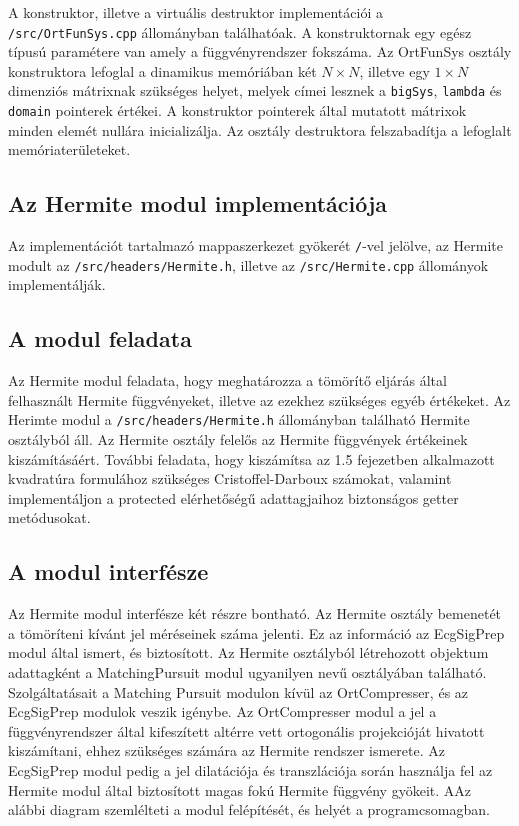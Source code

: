\documentclass[oneside,titlepage,12pt,a4paper]{report}
\begin{document}
\par A konstruktor, illetve a virtuális destruktor implementációi a \texttt{/src/OrtFunSys.cpp} állományban találhatóak. A konstruktornak egy egész típusú paramétere van amely a függvényrendszer fokszáma. Az OrtFunSys osztály konstruktora lefoglal a dinamikus memóriában két $N\times N$, illetve egy $1\times N$ dimenziós mátrixnak szükséges helyet, melyek címei lesznek a \texttt{bigSys}, \texttt{lambda} és \texttt{domain} pointerek értékei. A konstruktor pointerek által mutatott mátrixok minden elemét nullára inicializálja. Az osztály destruktora felszabadítja a lefoglalt memóriaterületeket. 


\subsection{Az Hermite modul implementációja} \label{subsec::hermimpl}

Az implementációt tartalmazó mappaszerkezet gyökerét \texttt{/}-vel jelölve, az Hermite modult  az \texttt{/src/headers/Hermite.h}, illetve az \texttt{/src/Hermite.cpp} állományok implementálják.

\subsection*{A modul feladata}

\par Az Hermite modul feladata, hogy meghatározza a tömörítő eljárás által felhasznált Hermite függvényeket, illetve az ezekhez szükséges egyéb értékeket. Az Herimte modul a \texttt{/src/headers/Hermite.h} állományban található Hermite osztályból áll. Az Hermite osztály felelős az Hermite függvények értékeinek kiszámításáért. További feladata, hogy kiszámítsa az 1.5 fejezetben alkalmazott kvadratúra formulához szükséges Cristoffel-Darboux számokat, valamint implementáljon a protected elérhetőségű adattagjaihoz biztonságos getter metódusokat.

\subsection*{A modul interfésze}

\par Az Hermite modul interfésze két részre bontható. Az Hermite osztály bemenetét a tömöríteni kívánt jel méréseinek száma jelenti. Ez az információ az EcgSigPrep modul által ismert, és biztosított. Az Hermite osztályból létrehozott objektum adattagként a MatchingPursuit modul ugyanilyen nevű osztályában található. Szolgáltatásait a Matching Pursuit modulon kívül az OrtCompresser, és az EcgSigPrep modulok veszik igénybe. Az OrtCompresser modul a jel a függvényrendszer által kifeszített altérre vett ortogonális projekcióját hivatott kiszámítani, ehhez szükséges számára az Hermite rendszer ismerete. Az EcgSigPrep modul pedig a jel dilatációja és transzlációja során használja fel az Hermite modul által biztosított magas fokú Hermite függvény gyökeit.  AAz alábbi diagram szemlélteti a modul felépítését, és helyét a programcsomagban.
\end{document}
